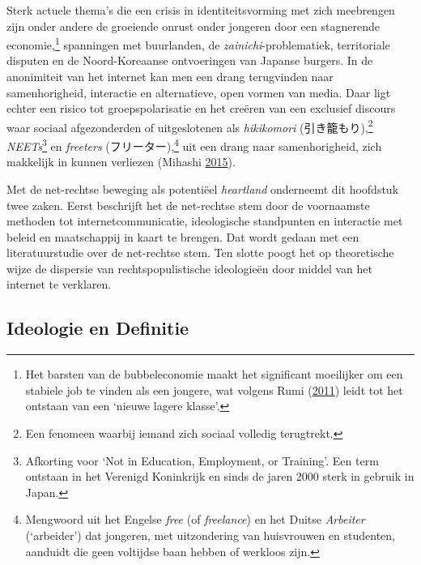 \documentclass[10.5pt,dutch,]{article}
\begin{document}
Sterk actuele thema's die een crisis in identiteitsvorming met zich
meebrengen zijn onder andere de groeiende onrust onder jongeren door een
stagnerende economie,\footnote{Het barsten van de bubbeleconomie maakt
  het significant moeilijker om een stabiele job te vinden als een
  jongere, wat volgens Rumi
  (\protect\hyperlink{ref-rumiux5fkoreansux5f2011}{2011}) leidt tot het
  ontstaan van een `nieuwe lagere klasse'.} spanningen met buurlanden,
de \emph{zainichi}-problematiek, territoriale disputen en de
Noord-Koreaanse ontvoeringen van Japanse burgers. In de anonimiteit van
het internet kan men een drang terugvinden naar samenhorigheid,
interactie en alternatieve, open vormen van media. Daar ligt echter een
risico tot groepspolarisatie en het creëren van een exclusief discours
waar sociaal afgezonderden of uitgeslotenen als \emph{hikikomori}
(引き籠もり),\footnote{Een fenomeen waarbij iemand zich sociaal volledig
  terugtrekt.} \emph{NEETs}\footnote{Afkorting voor `Not in Education,
  Employment, or Training'. Een term ontstaan in het Verenigd Koninkrijk
  en sinds de jaren 2000 sterk in gebruik in Japan.} en \emph{freeters}
(フリーター),\footnote{Mengwoord uit het Engelse \emph{free} (of
  \emph{freelance}) en het Duitse \emph{Arbeiter} (`arbeider') dat
  jongeren, met uitzondering van huisvrouwen en studenten, aanduidt die
  geen voltijdse baan hebben of werkloos zijn.} uit een drang naar
samenhorigheid, zich makkelijk in kunnen verliezen (Mihashi
\protect\hyperlink{ref-izumiux5fmihashiux5fconfessionsux5f2015}{2015}).

Met de net-rechtse beweging als potentiëel \emph{heartland} onderneemt
dit hoofdstuk twee zaken. Eerst beschrijft het de net-rechtse stem door
de voornaamste methoden tot internetcommunicatie, ideologische
standpunten en interactie met beleid en maatschappij in kaart te
brengen. Dat wordt gedaan met een literatuurstudie over de net-rechtse
stem. Ten slotte poogt het op theoretische wijze de dispersie van
rechtspopulistische ideologieën door middel van het internet te
verklaren.

\subsection{Ideologie en Definitie}\label{ideologie-en-definitie}
\end{document}
